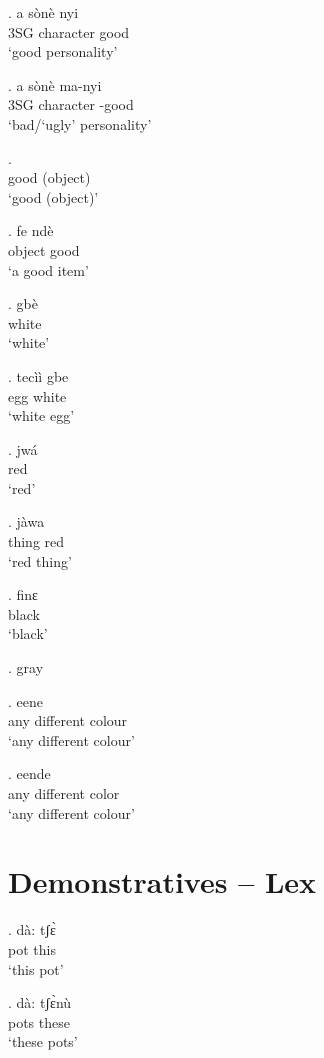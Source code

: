 \documentclass{assets/fieldnotes}
\begin{document}
\exg. a sònè nyi\\
3SG character good\\
`good personality'

\exg. a sònè ma-nyi\\
3SG character \Neg{}-good\\
`bad/`ugly' personality'

\exg. \\
good (object)\\
`good (object)'

\exg. fe ndè\\
object good\\
`a good item'


\exg. gbè\\
white\\
`white'

\exg. tecìì gbe\\
egg white\\
`white egg'

\exg. jwá\\
red\\
`red'

\exg.  jàwa\\
thing red\\
`red thing'

\exg. finɛ\\
black\\
`black'


\ex. gray\\

\exg. {\textltailn}e{\textltailn}ene\\
any different colour\\
`any different colour'

\exg. {\textltailn}e{\textltailn}ende\\
any different color\\
`any different colour'


\section{Demonstratives -- Lex} 
\exg. dà: tʃɛ̀\\
 pot this\\
`this pot'

\exg. dà: tʃɛ̀nù\\
 pots these\\
`these pots'
\end{document}
